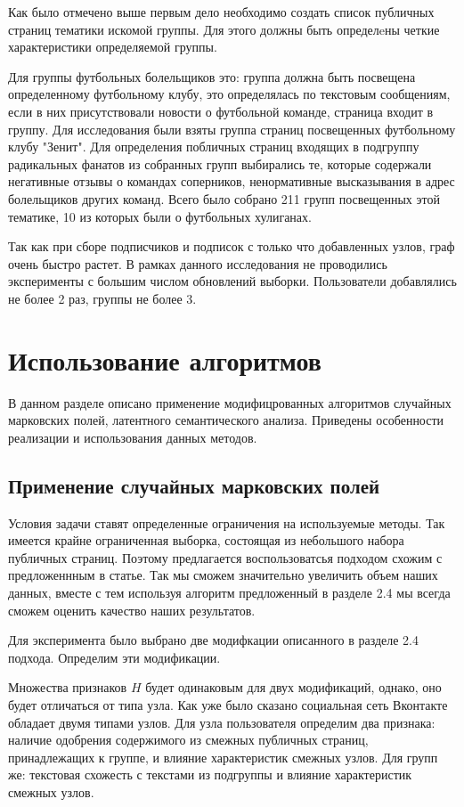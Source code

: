 \documentclass[annotation,times,page4]{itmo-student-thesis}
\begin{document}
Как было отмечено выше первым дело необходимо создать список публичных страниц тематики искомой группы. 
Для этого должны быть определeны четкие характеристики определяемой группы.

Для группы футбольных болельщиков это: группа должна быть посвещена определенному футбольному клубу, это определялась по текстовым сообщениям, если в них присутствовали новости о футбольной команде, страница входит в группу. Для исследования были взяты группа страниц посвещенных футбольному клубу "Зенит". Для определения побличных страниц входящих в подгруппу радикальных фанатов из собранных групп выбирались те, которые  содержали негативные отзывы о командах соперников, ненормативные высказывания в адрес болельщиков других команд. Всего было собрано 211 групп посвещенных этой тематике, 10 из которых были о футбольных хулиганах.

Так как при сборе подписчиков и подписок с только что добавленных узлов, граф очень быстро растет. В рамках данного исследования не проводились эксперименты с большим числом обновлений выборки. Пользователи добавлялись не более 2 раз, группы не более 3.

\section{Использование алгоритмов}
В данном разделе описано применение модифицрованных алгоритмов случайных марковских полей, латентного семантического анализа. Приведены особенности реализации и использования данных методов.
\subsection{Применение случайных марковских полей}
Условия задачи ставят определенные ограничения на используемые методы. Так имеется крайне ограниченная выборка, состоящая из небольшого набора публичных страниц. Поэтому предлагается воспользоватсья подходом схожим с предложеннным в статье. Так мы сможем значительно увеличить объем наших данных, вместе с тем используя алгоритм предложенный в разделе 2.4 мы всегда сможем оценить качество наших результатов.

Для эксперимента было выбрано две модифкации описанного в разделе 2.4 подхода. 
Определим эти модификации.

Множества признаков $H$ будет одинаковым для двух модификаций, однако, оно будет отличаться от типа узла. Как уже было сказано социальная сеть Вконтакте обладает двумя типами узлов. Для узла пользователя определим два признака: наличие одобрения содержимого из смежных публичных страниц, принадлежащих к группе, и влияние характеристик смежных узлов. Для групп же: текстовая схожесть с текстами из подгруппы и влияние характеристик смежных узлов.
\end{document}
